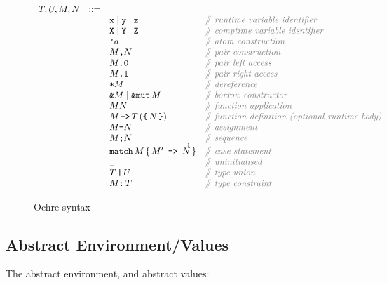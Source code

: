 \documentclass[12pt,twoside]{report}
\begin{document}
\begin{figure}[H]
  \arraycolsep=1pt %
  \centering

  \vspace{-2ex} %
  \[
  \begin{array}[t]{llll}
    T, U, M, N & ::= & & \\
    && \mono{x}\mid{}\mono{y}\mid{}\mono{z} & \comment{runtime variable identifier} \\
    && \mono{X}\mid{}\mono{Y}\mid{}\mono{Z} & \comment{comptime variable identifier} \\
    && \mono{'}a & \comment{atom construction} \\
    && M\mono{,} N & \comment{pair construction} \\
    && M\mono{.0} & \comment{pair left access} \\
    && M\mono{.1} & \comment{pair right access} \\
    && \mono{*}M & \comment{dereference} \\
    && \mono{\&}M \mid \mono{\&mut}\,M & \comment{borrow constructor} \\
    && M N & \comment{function application} \\
    && M \, \mono{->} \, T \,(\mono{\{}\,N\,\mono{\}}) & \comment{function definition (optional runtime body)} \\
    && M \mono{=} N & \comment{assignment} \\
    && M\mono{;} N & \comment{sequence} \\
    && \mono{match}\,M\,\{\,\overrightarrow{M'\mono{ => }N}\,\} & \comment{case statement} \\
    && \mono{\_} & \comment{uninitialised} \\
    && T\,\mono{|}\,U & \comment{type union} \\
    && M\mono{:}\,T & \comment{type constraint} \\
  \end{array} %
  \]
\caption{Ochre syntax} %
\label{fig:syntax} %
\end{figure} %

\FloatBarrier
\subsection{Abstract Environment/Values}
\FloatBarrier
The abstract environment, and abstract values:
\end{document}
